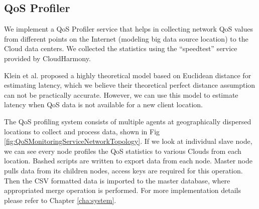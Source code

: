 \subsection{QoS Profiler}
\label{sec:QoSProfilerDesign}
We implement a QoS Profiler service that helps in collecting network QoS values from different points on the Internet (modeling big data source location) to the Cloud data centers.
We collected the statistics using the \enquote{speedtest} service provided by CloudHarmony.

Klein et al. \cite{klein2012towards} proposed a highly theoretical model based on Euclidean distance for estimating latency, which we believe their theoretical perfect distance assumption can not be practically accurate. However, we can use this model to estimate latency when QoS data is not available for a new client location.

The QoS profiling system consists of multiple agents at geographically dispersed locations to collect and process data, shown in Fig \ref{fig:QoSMonitoringServiceNetworkTopology}.
If we look at individual slave node, we can see every node profiles the QoS statistics to various Clouds from each location. Bashed scripts are written to export data from each node. Master node pulls data from its children nodes, access keys are required for this operation. Then the CSV formatted data is imported to the master database, where appropriated merge operation is performed. For more implementation details please refer to Chapter \ref{cha:system}.

